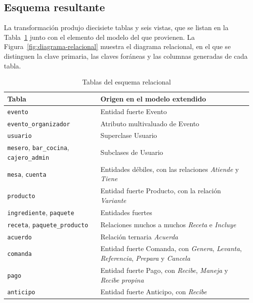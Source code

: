 \subsection{Esquema resultante}

La transformación produjo diecisiete tablas y seis vistas, que se listan en la Tabla~\ref{tab:tablas} junto con el elemento del modelo del que provienen. La Figura~\ref{fig:diagrama-relacional} muestra el diagrama relacional, en el que se distinguen la clave primaria, las claves foráneas y las columnas generadas de cada tabla.

\begin{table}[H]
    \centering
    \small
    \begin{tabularx}{\textwidth}
        {
            >{\RaggedRight\arraybackslash}p{3.4cm}
            >{\RaggedRight\arraybackslash}X
        }
        \toprule
        \textbf{Tabla} & \textbf{Origen en el modelo extendido} \\
        \midrule
        \texttt{evento} & Entidad fuerte Evento \\
        \texttt{evento\_organizador} & Atributo multivaluado de Evento \\
        \texttt{usuario} & Superclase Usuario \\
        \texttt{mesero}, \texttt{bar\_cocina}, \texttt{cajero\_admin} & Subclases de Usuario \\
        \texttt{mesa}, \texttt{cuenta} & Entidades débiles, con las relaciones \textit{Atiende} y \textit{Tiene} \\
        \texttt{producto} & Entidad fuerte Producto, con la relación \textit{Variante} \\
        \texttt{ingrediente}, \texttt{paquete} & Entidades fuertes \\
        \texttt{receta}, \texttt{paquete\_producto} & Relaciones muchos a muchos \textit{Receta} e \textit{Incluye} \\
        \texttt{acuerdo} & Relación ternaria \textit{Acuerda} \\
        \texttt{comanda} & Entidad fuerte Comanda, con \textit{Genera}, \textit{Levanta}, \textit{Referencia}, \textit{Prepara} y \textit{Cancela} \\
        \texttt{pago} & Entidad fuerte Pago, con \textit{Recibe}, \textit{Maneja} y \textit{Recibe propina} \\
        \texttt{anticipo} & Entidad fuerte Anticipo, con \textit{Recibe} \\
        \bottomrule
    \end{tabularx}
    \captionsetup{labelfont=bf, textfont=it, labelsep=newline, justification=raggedright, singlelinecheck=false}
    \caption{Tablas del esquema relacional}
    \label{tab:tablas}
\end{table}


